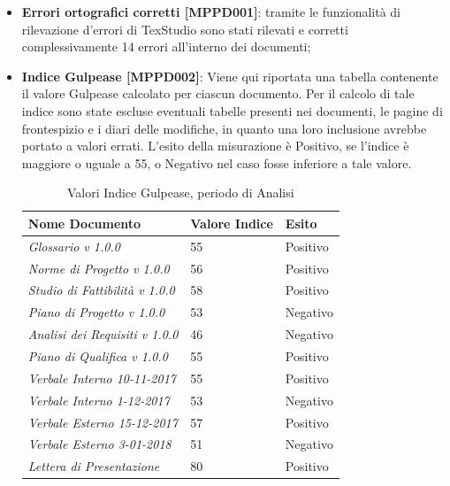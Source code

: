 \documentclass[openany,12pt,a4paper]{report}
\begin{document}
\begin{itemize}
	\item \textbf{Errori ortografici corretti [MPPD001]}: tramite le funzionalità di rilevazione d'errori di TexStudio sono stati rilevati e corretti complessivamente 14 errori all'interno dei documenti;
	
	\item \textbf{Indice Gulpease [MPPD002]}: Viene qui riportata una tabella contenente il valore Gulpease calcolato per ciascun documento.
	Per il calcolo di tale indice sono state escluse eventuali tabelle presenti nei documenti, le pagine di frontespizio e i diari delle modifiche, in quanto una loro inclusione avrebbe portato a valori errati. L'esito della misurazione è Positivo, se l'indice è maggiore o uguale a 55, o Negativo nel caso fosse inferiore a tale valore.
	
	\begin{table}
		\begin{center}
			\setlength\LTleft{6mm}
			\begin{longtable}{|p{60mm}|p{30mm}|p{25mm}|}
				\hline  
				\textbf{Nome Documento} & \textbf{Valore Indice} & \textbf{Esito} \\ \hline    
				\textit{Glossario v 1.0.0} & 55 & Positivo\\ \hline    
				\textit{Norme di Progetto v 1.0.0} & 56 & Positivo\\ \hline    
				\textit{Studio di Fattibilità v 1.0.0} & 58 & Positivo\\ \hline    
				\textit{Piano di Progetto v 1.0.0} & 53 & Negativo\\ \hline    
				\textit{Analisi dei Requisiti v 1.0.0} & 46 & Negativo\\ \hline    
				\textit{Piano di Qualifica v 1.0.0} & 55 & Positivo\\ \hline    
				\textit{Verbale Interno 10-11-2017} & 55 & Positivo\\ \hline    
				\textit{Verbale Interno 1-12-2017} & 53 & Negativo\\ \hline    
				\textit{Verbale Esterno 15-12-2017} & 57 & Positivo\\ \hline    
				\textit{Verbale Esterno 3-01-2018} & 51 & Negativo\\ \hline   
				\textit{Lettera di Presentazione} & 80 & Positivo\\ \hline
			\end{longtable}
		\end{center}
		\caption{Valori Indice Gulpease, periodo di Analisi} 
	\end{table} 


\end{itemize}
\end{document}

